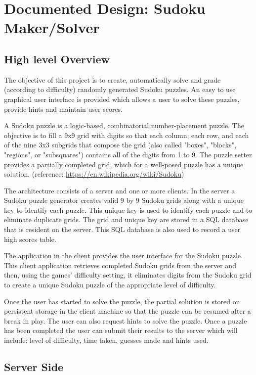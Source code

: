\documentclass[fleqn]{article}
\begin{document}
\section{Documented Design: Sudoku Maker/Solver}

\subsection{High level Overview}

The objective of this project is to create, automatically solve and grade (according to difficulty) randomly generated Sudoku puzzles. An easy to use graphical user interface is provided which allows a user to solve these puzzles, provide hints and maintain user scores. 

A Sudoku puzzle is a logic-based, combinatorial number-placement puzzle. The objective is to fill a 9x9 grid with digits so that each column, each row, and each of the nine 3x3 subgrids that compose the grid (also called "boxes", "blocks", "regions", or "subsquares") contains all of the digits from 1 to 9. The puzzle setter provides a partially completed grid, which for a well-posed puzzle has a unique solution. (reference: \url{https://en.wikipedia.org/wiki/Sudoku})

The architecture consists of a server and one or more clients. In the server a Sudoku puzzle generator creates valid 9 by 9 Sudoku grids along with a unique key to identify each puzzle. This unique key is used to identify each puzzle and to eliminate duplicate grids. The grid and unique key are stored in a SQL database that is resident on the server. This SQL database is also used to record a user high scores table.

The application in the client provides the user interface for the Sudoku puzzle. This client application retrieves completed Sudoku grids from the server and then, using the games’ difficulty setting, it eliminates digits from the Sudoku grid to create a unique Sudoku puzzle of the appropriate level of difficulty. 

Once the user has started to solve the puzzle, the partial solution is stored on persistent storage in the client machine so that the puzzle can be resumed after a break in play.  The user can also request hints to solve the puzzle. Once a puzzle has been completed the user can submit their results to the server which will include: level of difficulty, time taken, guesses made and hints used.

\subsection{Server Side}
\end{document}

